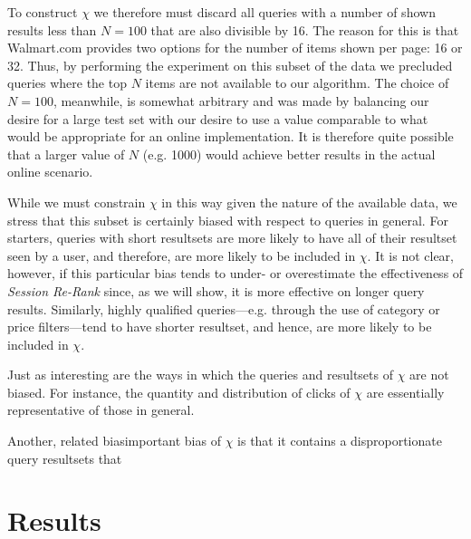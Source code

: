 \documentclass{article}
\begin{document}
To construct $\chi$ we therefore must discard all queries with a number of
shown results less than $N=100$ that are also divisible by 16. The reason for 
this is that Walmart.com provides two options for the number of items shown per
page: 16 or 32. Thus, by performing the experiment on this subset of the data we
precluded queries where the top $N$ items are not available to our algorithm.
The choice of $N=100$, meanwhile, is somewhat arbitrary and was made by balancing our desire
for a large test set with our desire to use a value comparable to what would be
appropriate for an online implementation. It is therefore quite possible that a
larger value of $N$ (e.g. 1000) would achieve better results in the actual
online scenario.

While we must constrain $\chi$ in this way given the nature of the available 
data, we stress that this subset is certainly biased with respect to queries 
in general. For starters, queries with short resultsets are more likely to 
have all of their resultset seen by a user, and therefore, are more likely to 
be included in $\chi$. It is not clear, however, if this particular bias
tends to under- or overestimate the effectiveness of {\em Session Re-Rank}
since, as we will show, it is more effective on longer query results. Similarly,
highly qualified queries---e.g. through the use of category or price filters---tend
to have shorter resultset, and hence, are more likely to be included in $\chi$.

Just as interesting are the ways in which the queries and resultsets of $\chi$
are not biased. For instance, the quantity and distribution of clicks of
$\chi$ are essentially representative of those in general.



Another,
related biasimportant bias of $\chi$ is that it contains a disproportionate query resultsets that 

\section{Results}
\end{document}
